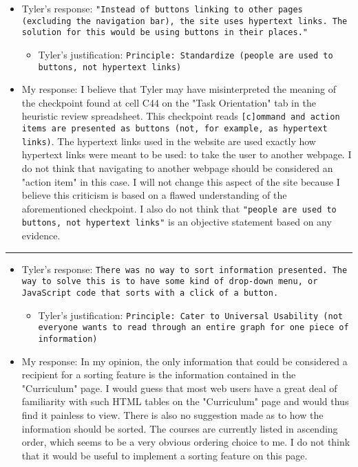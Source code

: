 \documentclass{article}
\begin{document}
\begin{itemize}
	\item Tyler's response: \texttt{"Instead of buttons linking to other pages (excluding the navigation bar), the site uses hypertext links.  The solution for this would be using buttons in their places."}
	\begin{itemize}
		\item Tyler's justification: \texttt{Principle: Standardize (people are used to buttons, not hypertext links)}
	\end{itemize}
	\item My response: I believe that Tyler may have misinterpreted the meaning of the checkpoint found at cell C44 on the "Task Orientation" tab in the heuristic review spreadsheet.  This checkpoint reads \texttt{[c]ommand and action items are presented as buttons (not, for example, as hypertext links)}.  The hypertext links used in the website are used exactly how hypertext links were meant to be used: to take the user to another webpage.  I do not think that navigating to another webpage should be considered an "action item" in this case.  I will not change this aspect of the site because I believe this criticism is based on a flawed understanding of the aforementioned checkpoint.  I also do not think that \texttt{"people are used to buttons, not hypertext links"} is an objective statement based on any evidence.
\end{itemize}
\noindent\rule{3cm}{0.4pt}
\begin{itemize}
	\item Tyler's response: \texttt{There was no way to sort information presented.  The way to solve this is to have some kind of drop-down menu, or JavaScript code that sorts with a click of a button.}
	\begin{itemize}
		\item Tyler's justification: \texttt{Principle: Cater to Universal Usability (not everyone wants to read through an entire graph for one piece of information)}
	\end{itemize}
	\item My response: In my opinion, the only information that could be considered a recipient for a sorting feature is the information contained in the "Curriculum" page.  I would guess that most web users have a great deal of familiarity with such HTML tables on the "Curriculum" page and would thus find it painless to view.  There is also no suggestion made as to how the information should be sorted.  The courses are currently listed in ascending order, which seems to be a very obvious ordering choice to me.  I do not think that it would be useful to implement a sorting feature on this page.
\end{itemize}
\end{document}
